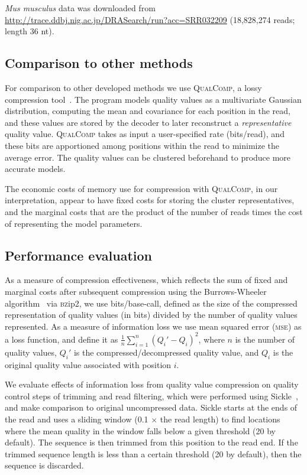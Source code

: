 \documentclass{bioinfo}
\begin{document}
\begin{methods}
\textit{Mus musculus} data was downloaded from
\url{http://trace.ddbj.nig.ac.jp/DRASearch/run?acc=SRR032209}
(18,828,274 reads; length 36 nt).

\subsection{Comparison to other methods}

For comparison to other developed methods we use \textsc{QualComp}, a
lossy compression tool~\citep{Ochoa:2013rt}. The program models
quality values as a multivariate Gaussian distribution, computing the
mean and covariance for each position in the read, and these values
are stored by the decoder to later reconstruct a \emph{representative}
quality value. \textsc{QualComp} takes as input a user-specified rate
(bits/read), and these bits are apportioned among positions within the
read to minimize the average error. The quality values can be
clustered beforehand to produce more accurate models.

The economic costs of memory use for compression with
\textsc{QualComp}, in our interpretation, appear to have fixed costs
for storing the cluster representatives, and the marginal costs that
are the product of the number of reads times the cost of representing
the model parameters.

\subsection{Performance evaluation}

As a measure of compression effectiveness, which reflects the sum of
fixed and marginal costs after subsequent compression using the
Burrows-Wheeler algorithm~\citep{bwt} via \textsc{bz}ip2, we use
bits/base-call, defined as the size of the compressed representation
of quality values (in bits) divided by the number of quality values
represented. As a measure of information loss we use mean squared
error (\textsc{mse}) as a loss function, and define it as
$\frac{1}{n}\sum_{i=1}^{n}{(Q_i'-Q_i)^2}$, where $n$ is the number of
quality values, $Q_i'$ is the compressed/decompressed quality value,
and $Q_i$ is the original quality value associated with position $i$.

We evaluate effects of information loss from quality value compression
on quality control steps of trimming and read filtering, which were
performed using Sickle~\citep{sickle}, and make comparison to original
uncompressed data. Sickle starts at the ends of the read and uses a
sliding window (0.1 $\times$ the read length) to find locations where
the mean quality in the window falls below a given threshold (20 by
default). The sequence is then trimmed from this position to the read
end. If the trimmed sequence length is less than a certain threshold
(20 by default), then the sequence is discarded.


\end{methods}
\end{document}
